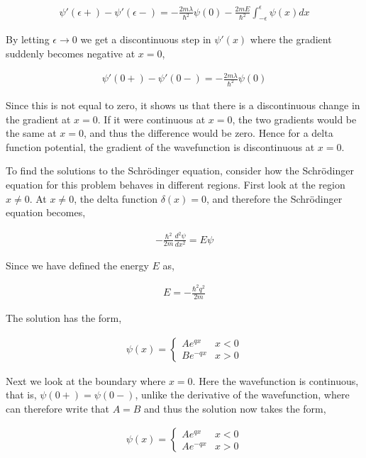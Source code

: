 \documentclass[11pt]{amsart}
\begin{document}
\begin{align*}
  \psi'(\epsilon+) - \psi'(\epsilon-) = -\frac{2m\lambda}{\hbar^2}\psi(0) - \frac{2mE}{\hbar^2}\int_{-\epsilon}^{\epsilon}\psi(x) dx
\end{align*}

By letting $\epsilon \to 0$ we get a discontinuous step in $\psi'(x)$ where the gradient suddenly becomes negative at $x = 0$,

\begin{align}
  \label{eq:wfderiv}
  \psi'(0+)-\psi'(0-)=-\frac{2m\lambda}{\hbar^2}\psi(0)
\end{align}

Since this is not equal to zero, it shows us that there is a discontinuous change in the gradient at $x = 0$. If it were continuous at $x = 0$, the two gradients would be the same at $x = 0$, and thus the difference would be zero. Hence for a delta function potential, the gradient of the wavefunction is discontinuous at $x = 0$.

To find the solutions to the Schr\"{o}dinger equation, consider how the Schr\"{o}dinger equation for this problem behaves in different regions. First look at the region $x \neq 0$. At $x \neq 0$, the delta function $\delta(x) = 0$, and therefore the Schr\"{o}dinger equation becomes,

\begin{align*}
  -\frac{\hbar^2}{2m}\frac{d^2\psi}{dx^2} = E\psi
\end{align*}

Since we have defined the energy $E$ as,

\begin{align*}
  E = -\frac{\hbar^2q^2}{2m}
\end{align*}

The solution has the form,

\begin{align*}
  \psi(x) =
  \begin{cases}
    Ae^{qx} & x < 0 \\
    Be^{-qx} & x > 0
  \end{cases}
\end{align*}

Next we look at the boundary where $x = 0$. Here the wavefunction is continuous, that is, $\psi(0+) = \psi(0-)$, unlike the derivative of the wavefunction, where can therefore write that $A = B$ and thus the solution now takes the form,

\begin{align*}
  \psi(x) =
  \begin{cases}
    Ae^{qx} & x < 0 \\
    Ae^{-qx} & x > 0
  \end{cases}
\end{align*}
\end{document}
